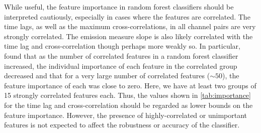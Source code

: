 While useful, the feature importance in random forest classifiers should be interpreted cautiously, especially in cases where the features are correlated.
The time lags, as well as the maximum cross-correlations, in all channel pairs are very strongly correlated.
The emission measure slope is also likely correlated with the time lag and cross-correlation though perhaps more weakly so.
In particular, \citet{altmann_permutation_2010} found that as the number of correlated features in a random forest classifier increased, the individual importance of each feature in the correlated group decreased and that for a very large number of correlated features ($\sim50$), the feature importance of each was close to zero.
Here, we have at least two groups of 15 strongly correlated features each.
Thus, the values shown in \autoref{tab:importance} for the time lag and cross-correlation should be regarded as lower bounds on the feature importance. 
However, the presence of highly-correlated or unimportant features is not expected to affect the robustness or accuracy of the classifier.
